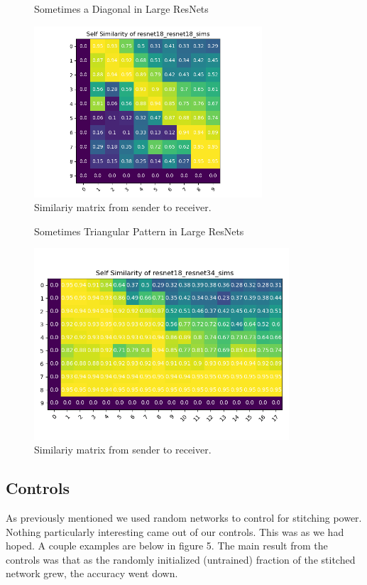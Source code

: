 \documentclass{article} %
\begin{document}
\label{Figure3}
\begin{center}
   \begin{figure}[h!]
      \centering
      \caption{Sometimes a Diagonal in Large ResNets}
      \includegraphics[width=8.5cm]{resnet18_resnet18_sims.png}
      \caption*{Similariy matrix from sender to receiver.}
   \end{figure}
\end{center}

\label{Figure4}
\begin{center}
   \begin{figure}[h!]
      \centering
      \caption{Sometimes Triangular Pattern in Large ResNets}
      \includegraphics[width=9.5cm]{resnet18_resnet34_sims.png}
      \caption*{Similariy matrix from sender to receiver.}
   \end{figure}
\end{center}

\subsection*{Controls}
As previously mentioned we used random networks to control for stitching power. Nothing particularly interesting
came out of our controls. This was as we had hoped. A couple examples are below in figure 5. The main result from the controls
was that as the randomly initialized (untrained) fraction of the stitched network grew, the accuracy went down.
\end{document}
